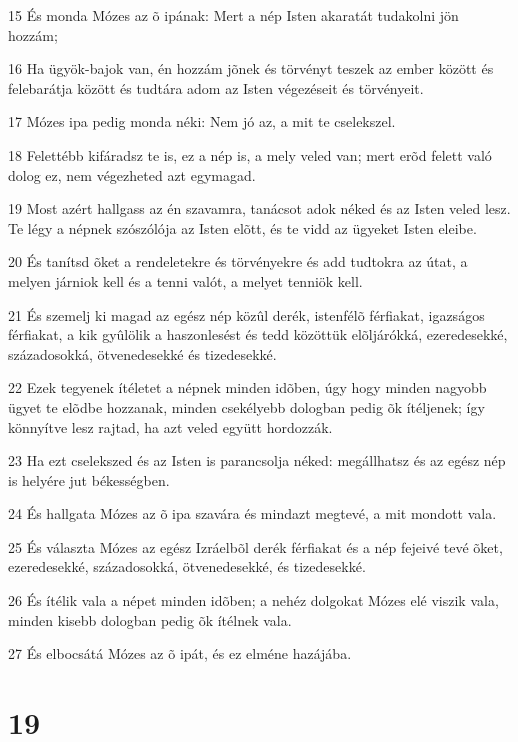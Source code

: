 \par 15 És monda Mózes az õ ipának: Mert a nép Isten akaratát tudakolni jön hozzám;
\par 16 Ha ügyök-bajok van, én hozzám jõnek és törvényt teszek az ember között és felebarátja között és tudtára adom az Isten végezéseit és törvényeit.
\par 17 Mózes ipa pedig monda néki: Nem jó az, a mit te cselekszel.
\par 18 Felettébb kifáradsz te is, ez a nép is, a mely veled van; mert erõd felett való dolog ez, nem végezheted azt egymagad.
\par 19 Most azért hallgass az én szavamra, tanácsot adok néked és az Isten veled lesz. Te légy a népnek szószólója az Isten elõtt, és te vidd az ügyeket Isten eleibe.
\par 20 És tanítsd õket a rendeletekre és törvényekre és add tudtokra az útat, a melyen járniok kell és a tenni valót, a melyet tenniök kell.
\par 21 És szemelj ki magad az egész nép közûl derék, istenfélõ férfiakat, igazságos férfiakat, a kik gyûlölik a haszonlesést és tedd közöttük elõljárókká, ezeredesekké, századosokká, ötvenedesekké és tizedesekké.
\par 22 Ezek tegyenek ítéletet a népnek minden idõben, úgy hogy minden nagyobb ügyet te elõdbe hozzanak, minden csekélyebb dologban pedig õk ítéljenek; így könnyítve lesz rajtad, ha azt veled együtt hordozzák.
\par 23 Ha ezt cselekszed és az Isten is parancsolja néked: megállhatsz és az egész nép is helyére jut békességben.
\par 24 És hallgata Mózes az õ ipa szavára és mindazt megtevé, a mit mondott vala.
\par 25 És választa Mózes az egész Izráelbõl derék férfiakat és a nép fejeivé tevé õket, ezeredesekké, századosokká, ötvenedesekké, és tizedesekké.
\par 26 És ítélik vala a népet minden idõben; a nehéz dolgokat Mózes elé viszik vala, minden kisebb dologban pedig õk ítélnek vala.
\par 27 És elbocsátá Mózes az õ ipát, és ez elméne hazájába.

\chapter{19}

